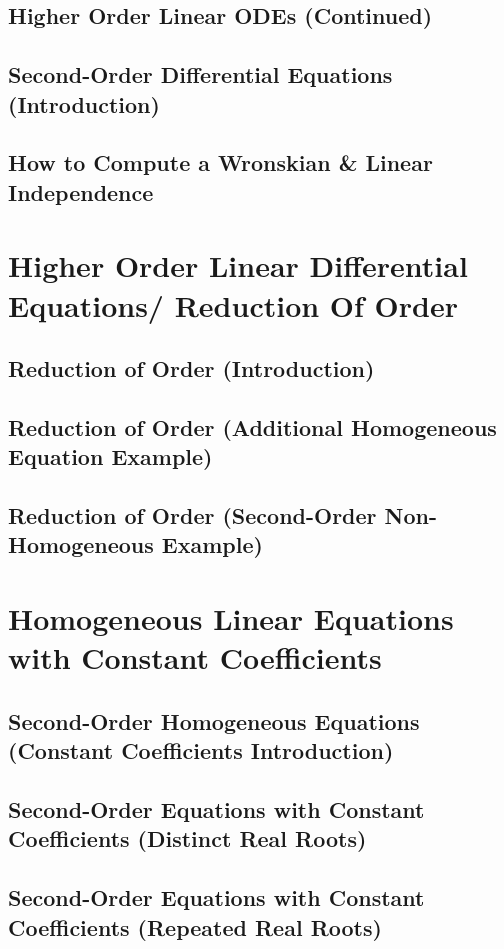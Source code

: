 \documentclass[10pt]{article}
\begin{document}
\subsection{Higher Order Linear ODEs (Continued)}
\subsection{Second-Order Differential Equations (Introduction)}
\subsection{How to Compute a Wronskian \& Linear Independence}

\section{Higher Order Linear Differential Equations/ Reduction Of Order}
\subsection{Reduction of Order (Introduction)}
\subsection{Reduction of Order (Additional Homogeneous Equation Example)}
\subsection{Reduction of Order (Second-Order Non-Homogeneous Example)}

\section{Homogeneous Linear Equations with Constant Coefficients }
\subsection{Second-Order Homogeneous Equations (Constant Coefficients Introduction)}
\subsection{Second-Order Equations with Constant Coefficients (Distinct Real Roots)}
\subsection{Second-Order Equations with Constant Coefficients (Repeated Real Roots)}
\end{document}
